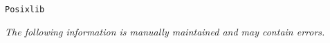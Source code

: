 \label{pkg:posixlib}
\begin{verbatim}
Posixlib
\end{verbatim}
{\tiny\it The following information is manually maintained and may contain errors.}

